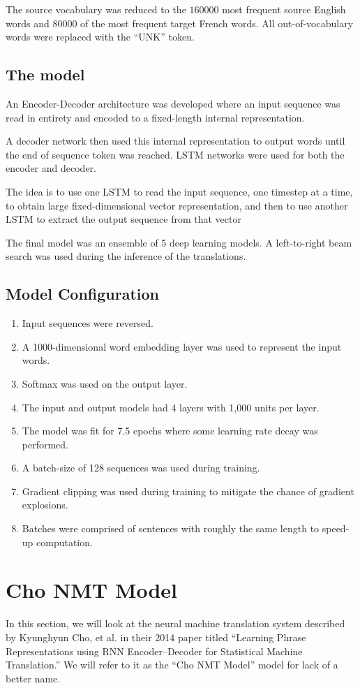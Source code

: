 \documentclass[10pt,a4paper]{article}
\begin{document}
The source vocabulary was reduced to the $160000$ most frequent source English words and $80000$ of the most frequent target French words. All out-of-vocabulary words were replaced with the “UNK” token.

\subsection{The model}
An Encoder-Decoder architecture was developed where an input sequence was read in entirety and encoded to a fixed-length internal representation.

A decoder network then used this internal representation to output words until the end of sequence token was reached. LSTM networks were used for both the encoder and decoder.

The idea is to use one LSTM to read the input sequence, one timestep at a time, to obtain large fixed-dimensional vector representation, and then to use another LSTM to extract the output sequence from that vector

The final model was an ensemble of 5 deep learning models. A left-to-right beam search was used during the inference of the translations.

\subsection{Model Configuration}
\begin{enumerate}
\item Input sequences were reversed.
\item A 1000-dimensional word embedding layer was used to represent the input words.
\item Softmax was used on the output layer.
\item The input and output models had 4 layers with 1,000 units per layer.
\item The model was fit for 7.5 epochs where some learning rate decay was performed.
\item A batch-size of 128 sequences was used during training.
\item Gradient clipping was used during training to mitigate the chance of gradient explosions.
\item Batches were comprised of sentences with roughly the same length to speed-up computation.
\end{enumerate}

\section{Cho NMT Model}
	In this section, we will look at the neural machine translation system described by Kyunghyun Cho, et al. in their 2014 paper titled “Learning Phrase Representations using RNN Encoder–Decoder for Statistical Machine Translation.” We will refer to it as the “Cho NMT Model” model for lack of a better name.
	
\end{document}
